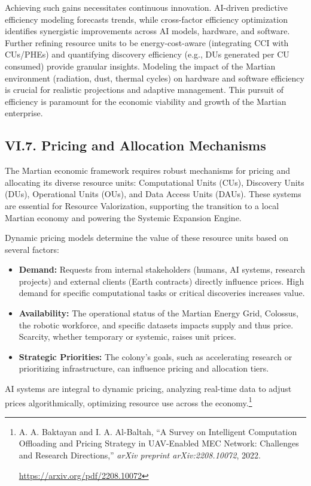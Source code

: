\documentclass[fontsize=10pt, oneside, DIV=calc]{scrartcl}
\begin{document}
\medskip

\noindent
Achieving such gains necessitates continuous innovation. AI-driven predictive efficiency modeling forecasts trends, while cross-factor efficiency optimization identifies synergistic improvements across AI models, hardware, and software. Further refining resource units to be energy-cost-aware (integrating CCI with CUs/PHEs) and quantifying discovery efficiency (e.g., DUs generated per CU consumed) provide granular insights. Modeling the impact of the Martian environment (radiation, dust, thermal cycles) on hardware and software efficiency is crucial for realistic projections and adaptive management. This pursuit of efficiency is paramount for the economic viability and growth of the Martian enterprise.



\subsection*{VI.7. Pricing and Allocation Mechanisms}



\medskip

\noindent
The Martian economic framework requires robust mechanisms for pricing and allocating its diverse resource units: Computational Units (CUs), Discovery Units (DUs), Operational Units (OUs), and Data Access Units (DAUs). These systems are essential for Resource Valorization, supporting the transition to a local Martian economy and powering the Systemic Expansion Engine.

\medskip

\noindent
Dynamic pricing models determine the value of these resource units based on several factors:
\begin{itemize}
    \item \textbf{Demand:} Requests from internal stakeholders (humans, AI systems, research projects) and external clients (Earth contracts) directly influence prices. High demand for specific computational tasks or critical discoveries increases value.
    \item \textbf{Availability:} The operational status of the Martian Energy Grid, Colossus, the robotic workforce, and specific datasets impacts supply and thus price. Scarcity, whether temporary or systemic, raises unit prices.
    \item \textbf{Strategic Priorities:} The colony's goals, such as accelerating research or prioritizing infrastructure, can influence pricing and allocation tiers.
\end{itemize}
AI systems are integral to dynamic pricing, analyzing real-time data to adjust prices algorithmically, optimizing resource use across the economy.\footnote{A. A. Baktayan and I. A. Al-Baltah, ``A Survey on Intelligent Computation Offloading and Pricing Strategy in UAV-Enabled MEC Network: Challenges and Research Directions,'' \textit{arXiv preprint arXiv:2208.10072}, 2022. 







\href{https://arxiv.org/pdf/2208.10072}\url{https://arxiv.org/pdf/2208.10072}}
\end{document}
